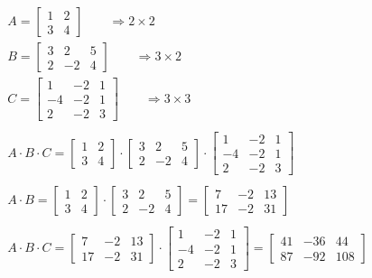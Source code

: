 \documentclass[italian]{article}
\begin{document}
\begin{gather*}
	A = 
	\begin{bmatrix}
		1 & 2 \\
		3 & 4
	\end{bmatrix} \qquad \Rightarrow 2 \times 2 \\
	B =
	\begin{bmatrix}
		3 & 2 & 5 \\
		2 & -2 & 4
	\end{bmatrix} \qquad \Rightarrow 3 \times 2 \\
	C = 
	\begin{bmatrix}
		1 & -2 & 1 \\
		-4 & -2 & 1 \\
		2 & -2 & 3
	\end{bmatrix} \qquad \Rightarrow 3 \times 3 \\\\
	A\cdot B \cdot C = 
	\begin{bmatrix}
		1 & 2 \\
		3 & 4
	\end{bmatrix}
	\cdot
	\begin{bmatrix}
		3 & 2 & 5 \\
		2 & -2 & 4
	\end{bmatrix}
	\cdot
	\begin{bmatrix}
		1 & -2 & 1 \\
		-4 & -2 & 1 \\
		2 & -2 & 3
	\end{bmatrix}\\\\
	A\cdot B =
	\begin{bmatrix}
		1 & 2 \\
		3 & 4
	\end{bmatrix}
	\cdot
	\begin{bmatrix}
		3 & 2 & 5 \\
		2 & -2 & 4
	\end{bmatrix}
	=
	\begin{bmatrix}
		7 & -2 & 13 \\
		17 & -2 & 31
	\end{bmatrix}\\\\
	A\cdot B \cdot C =
	\begin{bmatrix}
		7 & -2 & 13 \\
		17 & -2 & 31
	\end{bmatrix}
	\cdot
	\begin{bmatrix}
		1 & -2 & 1 \\
		-4 & -2 & 1 \\
		2 & -2 & 3
	\end{bmatrix}
	=
	\begin{bmatrix}
		41 & -36 & 44 \\
		87 & -92 & 108
	\end{bmatrix}
\end{gather*}\\
\end{document}
